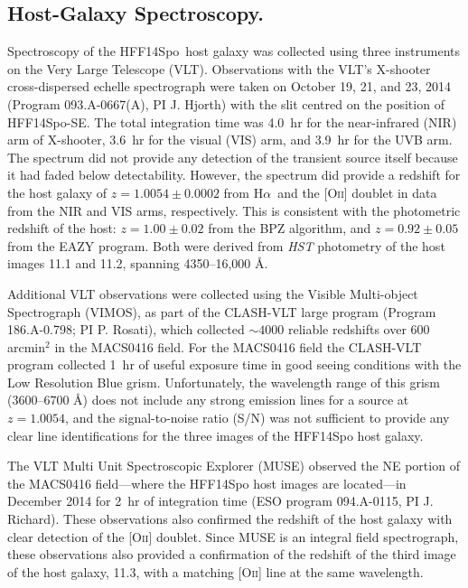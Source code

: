 \documentclass{article}
\providecommand\citep{\cite}
\def\Ha{\mbox{H$\alpha$}\xspace}
\newcommand\forbidden[2]{[#1{\scshape{#2}}]}
\def\HST{{\it HST}\xspace}
\def\spock{HFF14Spo\xspace}
\def\spocktwo{HFF14Spo-SE\xspace}
\def\macs0416{MACS0416\xspace}
\begin{document}
\subsection{Host-Galaxy Spectroscopy.}\label{sec:Spectroscopy}

Spectroscopy of the \spock\ host galaxy was collected using three
instruments on the Very Large Telescope (VLT).  Observations with the
VLT's X-shooter cross-dispersed echelle spectrograph\citep{Vernet:2011} were taken on October 19, 21, and 23, 2014
(Program 093.A-0667(A), PI J. Hjorth) with the slit centred on the
position of \spocktwo.  The total integration time was 4.0~hr for
the near-infrared (NIR) arm of X-shooter, 3.6~hr for the visual (VIS) 
arm, and 3.9~hr for
the UVB arm.  The spectrum did not provide any detection of the
transient source itself because it had faded
below detectability.  However, the spectrum did provide a
redshift for the host galaxy of $z=1.0054\pm0.0002$ from
\Ha\ and the \forbidden{O}{ii} doublet in data from the NIR and VIS
arms, respectively.  This is consistent with
the photometric redshift of the host: $z=1.00\pm0.02$
from the BPZ algorithm\citep{Benitez:2000}, and $z=0.92\pm0.05$ from
the EAZY program\citep{Brammer:2008}.  Both were derived from \HST
photometry of the host images 11.1 and 11.2, spanning 4350--16,000 \AA.

Additional VLT observations were collected using the Visible
Multi-object Spectrograph (VIMOS)\citep{LeFevre:2003}, as part of the
CLASH-VLT large program (Program 186.A-0.798; PI
P. Rosati)\citep{Rosati:2014}, which collected $\sim4000$ reliable
redshifts over 600 arcmin$^2$ in the \macs0416
field\citep{Grillo:2015,Balestra:2016}.   For the
\macs0416 field the CLASH-VLT program collected 1~hr of useful
exposure time in good seeing conditions with the Low Resolution Blue
grism.  Unfortunately, the wavelength range of this grism (3600--6700
\AA) does not include any strong emission lines for a source at
$z=1.0054$, and the signal-to-noise ratio (S/N) was not sufficient to provide
any clear line identifications for the three images of the \spock host
galaxy.

The VLT Multi Unit Spectroscopic Explorer (MUSE)\citep{Henault:2003,Bacon:2012} observed the NE portion of
the MACS0416 field---where the \spock host images are located---in
December 2014 for 2~hr of integration time (ESO program
094.A-0115, PI J.\,Richard).  These observations also confirmed the
redshift of the host galaxy with clear detection of the
\forbidden{O}{ii} doublet.  Since MUSE is an integral
field spectrograph, these observations also provided a confirmation of
the redshift of the third image of the host galaxy, 11.3, with a
matching \forbidden{O}{ii} line at the same wavelength\cite{Caminha:2017}.
\end{document}
